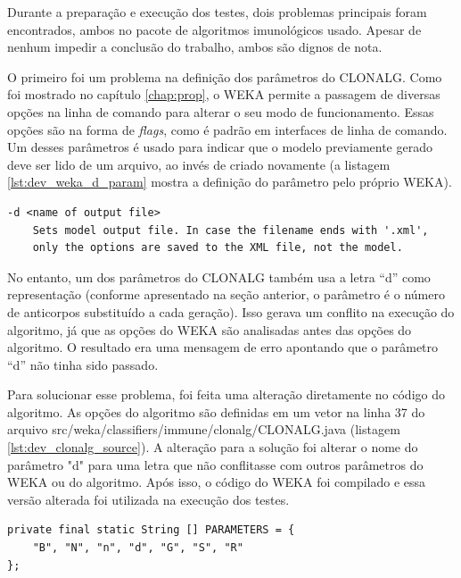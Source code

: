 Durante a preparação e execução dos testes, dois problemas principais foram encontrados, ambos no pacote de algoritmos imunológicos usado. Apesar de nenhum impedir a conclusão do trabalho, ambos são dignos de nota.

O primeiro foi um problema na definição dos parâmetros do CLONALG. Como foi mostrado no capítulo \ref{chap:prop}, o WEKA permite a passagem de diversas opções na linha de comando para alterar o seu modo de funcionamento. Essas opções são na forma de \emph{flags}, como é padrão em interfaces de linha de comando. Um desses parâmetros é usado para indicar que o modelo previamente gerado deve ser lido de um arquivo, ao invés de criado novamente (a listagem \ref{lst:dev_weka_d_param} mostra a definição do parâmetro pelo próprio WEKA).

\vspace{0.5cm}
\begin{lstlisting}[caption=Definição do parâmetro ``d'' no wEKA, label=lst:dev_weka_d_param]
-d <name of output file>
    Sets model output file. In case the filename ends with '.xml',
    only the options are saved to the XML file, not the model.
\end{lstlisting}
\vspace{0.5cm}

No entanto, um dos parâmetros do CLONALG também usa a letra ``d'' como representação (conforme apresentado na seção anterior, o parâmetro é o número de anticorpos substituído a cada geração). Isso gerava um conflito na execução do algoritmo, já que as opções do WEKA são analisadas antes das opções do algoritmo. O resultado era uma mensagem de erro apontando que o parâmetro ``d'' não tinha sido passado.

Para solucionar esse problema, foi feita uma alteração diretamente no código do algoritmo. As opções do algoritmo são definidas em um vetor na linha 37 do arquivo src/weka/classifiers/immune/clonalg/CLONALG.java (listagem \ref{lst:dev_clonalg_source}). A alteração para a solução foi alterar o nome do parâmetro "d" para uma letra que não conflitasse com outros parâmetros do WEKA ou do algoritmo. Após isso, o código do WEKA foi compilado e essa versão alterada foi utilizada na execução dos testes.

\vspace{0.5cm}
\begin{lstlisting}[caption=Código fonte original do CLONALG, label=lst:dev_clonalg_source]
private final static String [] PARAMETERS = {
    "B", "N", "n", "d", "G", "S", "R"
};
\end{lstlisting}
\vspace{0.5cm}

